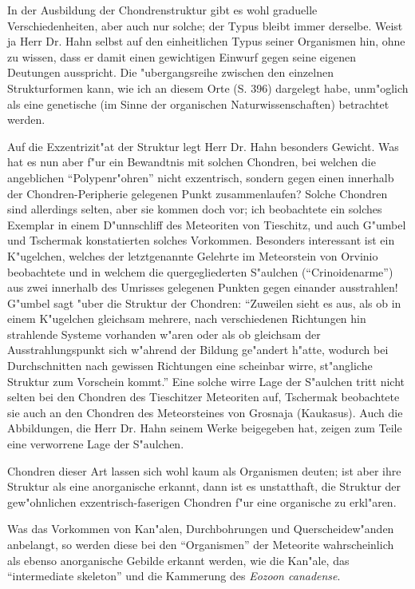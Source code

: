 \documentclass[a4paper, 12pt, oneside]{article}
\begin{document}
In der Ausbildung der Chondrenstruktur gibt es wohl graduelle Verschiedenheiten, aber auch nur solche; der Typus bleibt immer derselbe. Weist ja Herr Dr. Hahn selbst auf den einheitlichen Typus seiner Organismen hin, ohne zu wissen, dass er damit einen gewichtigen Einwurf gegen seine eigenen Deutungen ausspricht. Die "ubergangsreihe zwischen den einzelnen Strukturformen kann, wie ich an diesem Orte (S. 396) dargelegt habe, unm"oglich als eine genetische (im Sinne der organischen Naturwissenschaften) betrachtet werden.

Auf die Exzentrizit"at der Struktur legt Herr Dr. Hahn besonders Gewicht. Was hat es nun aber f"ur ein Bewandtnis mit solchen Chondren, bei welchen die angeblichen "`Polypenr"ohren"' nicht exzentrisch, sondern gegen einen innerhalb der Chondren-Peripherie gelegenen Punkt zusammenlaufen? Solche Chondren sind allerdings selten, aber sie kommen doch vor; ich beobachtete ein solches Exemplar in einem D"unnschliff des Meteoriten von Tieschitz, und auch G"umbel und Tschermak konstatierten solches Vorkommen. Besonders interessant ist ein K"ugelchen, welches der letztgenannte Gelehrte im Meteorstein von Orvinio beobachtete und in welchem die quergegliederten S"aulchen ("`Crinoidenarme"') aus zwei innerhalb des Umrisses gelegenen Punkten gegen einander ausstrahlen! G"umbel sagt "uber die Struktur der Chondren: "`Zuweilen sieht es aus, als ob in einem K"ugelchen gleichsam mehrere, nach verschiedenen Richtungen hin strahlende Systeme vorhanden w"aren oder als ob gleichsam der Ausstrahlungspunkt sich w"ahrend der Bildung ge"andert h"atte, wodurch bei Durchschnitten nach gewissen Richtungen eine scheinbar wirre, st"angliche Struktur zum Vorschein kommt."' Eine solche wirre Lage der S"aulchen tritt nicht selten bei den Chondren des Tieschitzer Meteoriten auf, Tschermak beobachtete sie auch an den Chondren des Meteorsteines von Grosnaja (Kaukasus). Auch die Abbildungen, die Herr Dr. Hahn seinem Werke beigegeben hat, zeigen zum Teile eine verworrene Lage der S"aulchen.

Chondren dieser Art lassen sich wohl kaum als Organismen deuten; ist aber ihre Struktur als eine anorganische erkannt, dann ist es unstatthaft, die Struktur der gew"ohnlichen exzentrisch-faserigen Chondren f"ur eine organische zu erkl"aren.

Was das Vorkommen von Kan"alen, Durchbohrungen und Querscheidew"anden anbelangt, so werden diese bei den "`Organismen"' der Meteorite wahrscheinlich als ebenso anorganische Gebilde erkannt werden, wie die Kan"ale, das "`intermediate skeleton"' und die Kammerung des \emph{Eozoon canadense}.
\end{document}
